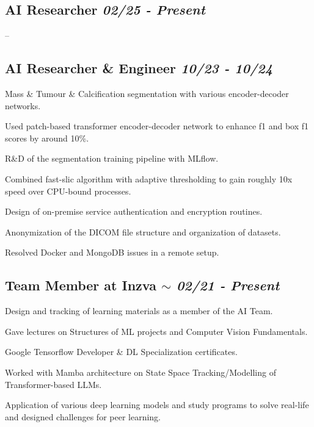 \documentclass[letter, 14pt]{article}
\begin{document}
\subsection{AI Researcher \hfill \textit{\textmd{02/25 - Present}}}
\begin{zitemize}
\item --
\end{zitemize}


\subsection{AI Researcher \& Engineer \hfill \textit{\textmd{10/23 - 10/24}}}
\begin{zitemize}
\item Mass \& Tumour \& Calcification segmentation with various encoder-decoder networks.
\item Used patch-based transformer encoder-decoder network to enhance f1 and box f1 scores by around 10\%.
\item R\&D of the segmentation training pipeline with MLflow.
\item Combined fast-slic algorithm with adaptive thresholding to gain roughly 10x speed over CPU-bound processes.
\item Design of on-premise service authentication and encryption routines.
\item Anonymization of the DICOM file structure and organization of datasets.
\item Resolved Docker and MongoDB issues in a remote setup. 
\end{zitemize}


\subsection{Team Member at Inzva \hfill\textit{\textmd{{\tiny$\sim$} 02/21 - Present}}}
\begin{zitemize}
\item Design and tracking of learning materials as a member of the AI Team.
\item Gave lectures on Structures of ML projects and Computer Vision Fundamentals.
\item Google Tensorflow Developer \& DL Specialization certificates.
\item Worked with Mamba architecture on State Space Tracking/Modelling of Transformer-based LLMs.
\item Application of various deep learning models and study programs to solve real-life and designed challenges for peer learning.
\end{zitemize}
\end{document}
